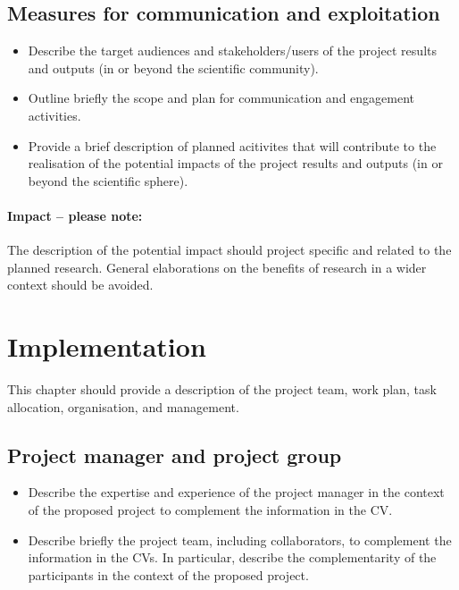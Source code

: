 \documentclass[11pt,a4paper,british]{article}
\begin{document}
\subsection{Measures for communication and exploitation}
\begin{itemize}
    \item Describe the target audiences and stakeholders/users of the project
        results and outputs (in or beyond the scientific community).
    \item Outline briefly the scope and plan for communication and engagement
        activities.
    \item Provide a brief description of planned acitivites that will
        contribute to the realisation of the potential impacts of the project
        results and outputs (in or beyond the scientific sphere).
\end{itemize}

\paragraph{Impact -- please note:}
The description of the potential impact should project specific and related to
the planned research. General elaborations on the benefits of research in a
wider context should be avoided.

\section{Implementation}
This chapter should provide a description of the project team, work plan, task
allocation, organisation, and management.

\subsection{Project manager and project group}
\begin{itemize}
    \item Describe the expertise and experience of the project manager in the
        context of the proposed project to complement the information in the
        CV.
    \item Describe briefly the project team, including collaborators, to
        complement the information in the CVs. In particular, describe the
        complementarity of the participants in the context of the proposed
        project.
\end{itemize}
\end{document}
